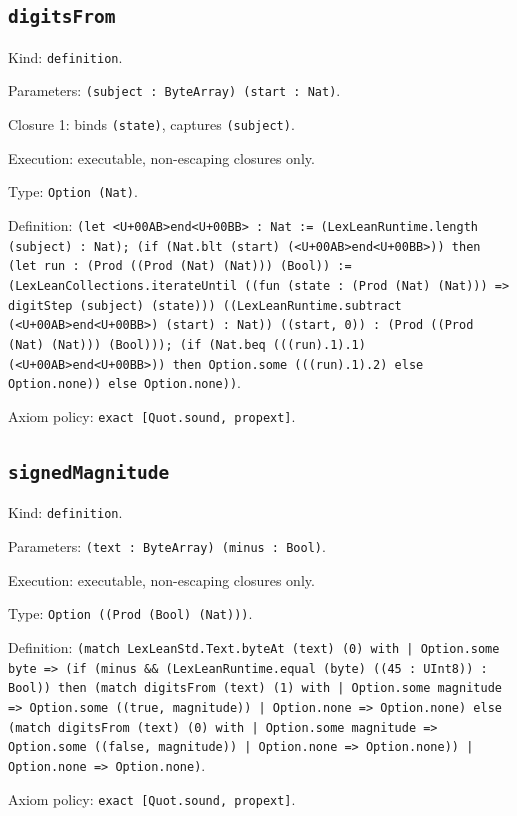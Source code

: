 \documentclass[11pt]{article}
\begin{document}
\subsection*{\texttt{digitsFrom}}
\noindent Kind: \texttt{definition}.\par
\noindent Parameters: \texttt{(subject : ByteArray) (start : Nat)}.\par
\noindent Closure 1: binds \texttt{(state)}, captures \texttt{(subject)}.\par
\noindent Execution: executable, non-escaping closures only.\par
\noindent Type: \texttt{Option (Nat)}.\par
\noindent Definition: \texttt{(let <U+00AB>end<U+00BB> : Nat := (LexLeanRuntime.length (subject) : Nat); (if (Nat.blt (start) (<U+00AB>end<U+00BB>)) then (let run : (Prod ((Prod (Nat) (Nat))) (Bool)) := (LexLeanCollections.iterateUntil ((fun (state : (Prod (Nat) (Nat))) => digitStep (subject) (state))) ((LexLeanRuntime.subtract (<U+00AB>end<U+00BB>) (start) : Nat)) ((start, 0)) : (Prod ((Prod (Nat) (Nat))) (Bool))); (if (Nat.beq (((run).1).1) (<U+00AB>end<U+00BB>)) then Option.some (((run).1).2) else Option.none)) else Option.none))}.\par
\noindent Axiom policy: \texttt{exact [Quot.sound, propext]}.\par
\subsection*{\texttt{signedMagnitude}}
\noindent Kind: \texttt{definition}.\par
\noindent Parameters: \texttt{(text : ByteArray) (minus : Bool)}.\par
\noindent Execution: executable, non-escaping closures only.\par
\noindent Type: \texttt{Option ((Prod (Bool) (Nat)))}.\par
\noindent Definition: \texttt{(match LexLeanStd.Text.byteAt (text) (0) with | Option.some byte => (if (minus \&\& (LexLeanRuntime.equal (byte) ((45 : UInt8)) : Bool)) then (match digitsFrom (text) (1) with | Option.some magnitude => Option.some ((true, magnitude)) | Option.none => Option.none) else (match digitsFrom (text) (0) with | Option.some magnitude => Option.some ((false, magnitude)) | Option.none => Option.none)) | Option.none => Option.none)}.\par
\noindent Axiom policy: \texttt{exact [Quot.sound, propext]}.\par
\end{document}
